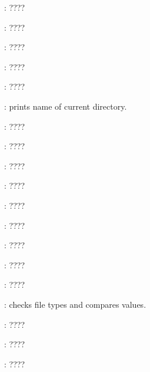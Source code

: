 \begin{compactenum}
\item [\symbolbash] : \dotfill ????

\item [\symbolbash] : \dotfill ????

\item [\symbolbash] : \dotfill ????

\item [\symbolbash] : \dotfill ????

\item [\symbolbash] : \dotfill ????

\item [\symbolbash] : prints name of current directory.

\item [\symbolbash] : \dotfill ????

\item [\symbolbash] : \dotfill ????

\item [\symbolbash] : \dotfill ????

\item [\symbolbash] : \dotfill ????

\item [\symbolbash] : \dotfill ????

\item [\symbolbash] : \dotfill ????

\item [\symbolbash] : \dotfill ????

\item [\symbolbash] : \dotfill ????

\item [\symbolbash] : \dotfill ????

\item [\symbolbash] : checks file types and compares values.

\item [\symbolbash] : \dotfill ????

\item [\symbolbash] : \dotfill ????

\item [\symbolbash] : \dotfill ????


\end{compactenum}
